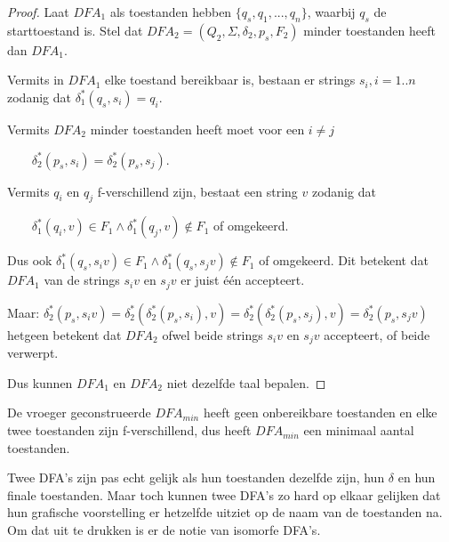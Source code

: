 \begin{proof}
Laat $DFA_1$ als toestanden hebben $\{q_s,q_1,...,q_n\}$, waarbij
$q_s$ de starttoestand is.  Stel dat
%
$DFA_2 = (Q_2,\Sigma,\delta_2,p_s,F_2)$
minder toestanden heeft dan $DFA_1$.


Vermits in $DFA_1$ elke toestand bereikbaar is, bestaan er strings
$s_i, i=1..n$ zodanig dat
%
$\delta_1^*(q_s,s_i) = q_i$. 


Vermits $DFA_2$ minder toestanden heeft moet voor een $i \neq j$

$~~~~~~~~~\delta_2^*(p_s,s_i) = \delta_2^*(p_s,s_j)$.


Vermits $q_i$ en $q_j$ f-verschillend zijn, bestaat een string $v$ zodanig
dat


$~~~~~~~~~\delta_1^*(q_i,v) \in F_1 \wedge \delta_1^*(q_j,v) \notin F_1$ of
omgekeerd.


Dus ook
%
$\delta_1^*(q_s,s_iv) \in F_1 \wedge \delta_1^*(q_s,s_jv) \notin F_1$ of
omgekeerd. Dit betekent dat $DFA_1$ van de strings $s_iv$ en $s_jv$ er juist \'{e}\'{e}n accepteert.


Maar:
$\delta_2^*(p_s,s_iv) = \delta_2^*(\delta_2^*(p_s,s_i),v) =
\delta_2^*(\delta_2^*(p_s,s_j),v) = \delta_2^*(p_s,s_jv)$
hetgeen betekent
dat $DFA_2$ ofwel beide strings $s_iv$ en $s_jv$ accepteert, of beide
verwerpt.


Dus kunnen $DFA_1$ en $DFA_2$ niet dezelfde taal bepalen.
\end{proof}


De vroeger geconstrueerde $DFA_{min}$ heeft geen onbereikbare
toestanden en elke twee toestanden zijn f-verschillend, dus heeft
$DFA_{min}$ een minimaal aantal toestanden.


Twee DFA's zijn pas echt gelijk als hun toestanden dezelfde zijn, hun
$\delta$ en hun finale toestanden. Maar toch kunnen twee DFA's zo hard
op elkaar gelijken dat hun grafische voorstelling er hetzelfde uitziet
op de naam van de toestanden na. Om dat uit te drukken is er de notie
van isomorfe DFA's.

